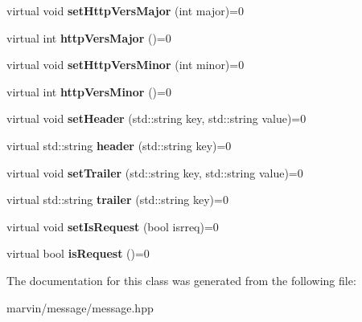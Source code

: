 \begin{DoxyCompactItemize}
virtual void {\bfseries set\+Http\+Vers\+Major} (int major)=0
\item 
\mbox{\label{class_message_interface_ad15146b7e0fc816acaa59e5a8c021b5e}} 
virtual int {\bfseries http\+Vers\+Major} ()=0
\item 
\mbox{\label{class_message_interface_a11180731a20ccf6ecffcf412520bd25b}} 
virtual void {\bfseries set\+Http\+Vers\+Minor} (int minor)=0
\item 
\mbox{\label{class_message_interface_a85a71b2c6917d95ee0028271af7b2f84}} 
virtual int {\bfseries http\+Vers\+Minor} ()=0
\item 
\mbox{\label{class_message_interface_af5978ed2686bef1f14099cc13d268e59}} 
virtual void {\bfseries set\+Header} (std\+::string key, std\+::string value)=0
\item 
\mbox{\label{class_message_interface_a946396d0fbafb81ebce2a1e56f8f6251}} 
virtual std\+::string {\bfseries header} (std\+::string key)=0
\item 
\mbox{\label{class_message_interface_a4633f3841d16d96b4885274c540c96c4}} 
virtual void {\bfseries set\+Trailer} (std\+::string key, std\+::string value)=0
\item 
\mbox{\label{class_message_interface_a18ad2751bb72126df4d7556482fc463c}} 
virtual std\+::string {\bfseries trailer} (std\+::string key)=0
\item 
\mbox{\label{class_message_interface_ac4f20cd49960e39c308aca5b525d2387}} 
virtual void {\bfseries set\+Is\+Request} (bool isrreq)=0
\item 
\mbox{\label{class_message_interface_a370d5f87a452cfa7db19e61aa9585e95}} 
virtual bool {\bfseries is\+Request} ()=0
\end{DoxyCompactItemize}


The documentation for this class was generated from the following file\+:\begin{DoxyCompactItemize}
\item 
marvin/message/message.\+hpp\end{DoxyCompactItemize}
